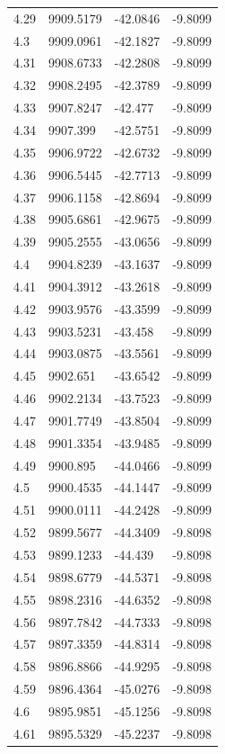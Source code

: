\begin{table}[H]
\begin{tabular}{llll}
4.29 & 9909.5179 & -42.0846 & -9.8099 \\
4.3 & 9909.0961 & -42.1827 & -9.8099 \\
4.31 & 9908.6733 & -42.2808 & -9.8099 \\
4.32 & 9908.2495 & -42.3789 & -9.8099 \\
4.33 & 9907.8247 & -42.477 & -9.8099 \\
4.34 & 9907.399 & -42.5751 & -9.8099 \\
4.35 & 9906.9722 & -42.6732 & -9.8099 \\
4.36 & 9906.5445 & -42.7713 & -9.8099 \\
4.37 & 9906.1158 & -42.8694 & -9.8099 \\
4.38 & 9905.6861 & -42.9675 & -9.8099 \\
4.39 & 9905.2555 & -43.0656 & -9.8099 \\
4.4 & 9904.8239 & -43.1637 & -9.8099 \\
4.41 & 9904.3912 & -43.2618 & -9.8099 \\
4.42 & 9903.9576 & -43.3599 & -9.8099 \\
4.43 & 9903.5231 & -43.458 & -9.8099 \\
4.44 & 9903.0875 & -43.5561 & -9.8099 \\
4.45 & 9902.651 & -43.6542 & -9.8099 \\
4.46 & 9902.2134 & -43.7523 & -9.8099 \\
4.47 & 9901.7749 & -43.8504 & -9.8099 \\
4.48 & 9901.3354 & -43.9485 & -9.8099 \\
4.49 & 9900.895 & -44.0466 & -9.8099 \\
4.5 & 9900.4535 & -44.1447 & -9.8099 \\
4.51 & 9900.0111 & -44.2428 & -9.8099 \\
4.52 & 9899.5677 & -44.3409 & -9.8098 \\
4.53 & 9899.1233 & -44.439 & -9.8098 \\
4.54 & 9898.6779 & -44.5371 & -9.8098 \\
4.55 & 9898.2316 & -44.6352 & -9.8098 \\
4.56 & 9897.7842 & -44.7333 & -9.8098 \\
4.57 & 9897.3359 & -44.8314 & -9.8098 \\
4.58 & 9896.8866 & -44.9295 & -9.8098 \\
4.59 & 9896.4364 & -45.0276 & -9.8098 \\
4.6 & 9895.9851 & -45.1256 & -9.8098 \\
4.61 & 9895.5329 & -45.2237 & -9.8098 \\

\end{tabular}
\end{table}
